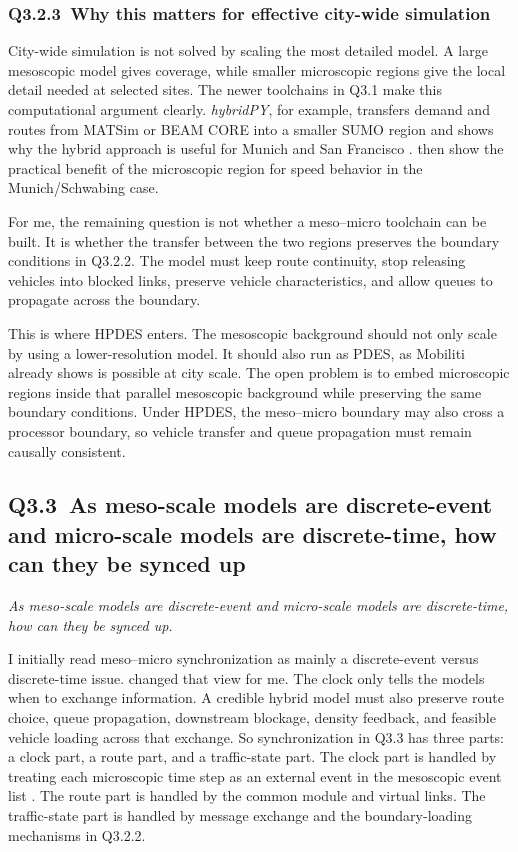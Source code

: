 \begin{bibunit}[plainnat]
\subsubsection{Q3.2.3\ Why this matters for effective city-wide simulation}

City-wide simulation is not solved by scaling the most detailed model. A large
mesoscopic model gives coverage, while smaller microscopic regions give the
local detail needed at selected sites. The newer toolchains in Q3.1 make this
computational argument clearly. \textit{hybridPY}, for example, transfers
demand and routes from MATSim or BEAM CORE into a smaller SUMO region and shows
why the hybrid approach is useful for Munich and San Francisco
\citep{schweizer2024hybridpy}. \citet{schuhmann2025hybrid} then show the
practical benefit of the microscopic region for speed behavior in the
Munich/Schwabing case.

For me, the remaining question is not whether a meso--micro toolchain can be
built. It is whether the transfer between the two regions preserves the
boundary conditions in Q3.2.2. The model must keep route continuity, stop
releasing vehicles into blocked links, preserve vehicle characteristics, and
allow queues to propagate across the boundary.

This is where HPDES enters. The mesoscopic background should not only scale by
using a lower-resolution model. It should also run as PDES, as Mobiliti already
shows is possible at city scale. The open problem is to embed microscopic
regions inside that parallel mesoscopic background while preserving the same
boundary conditions. Under HPDES, the meso--micro boundary may also cross a
processor boundary, so vehicle transfer and queue propagation must remain
causally consistent.

\subsection{Q3.3\ As meso-scale models are discrete-event and micro-scale models are discrete-time, how can they be synced up}

\textit{As meso-scale models are discrete-event and micro-scale models are discrete-time, how can they be synced up.}

\iffalse
I initially read meso--micro synchronization as mainly a discrete-event versus discrete-time issue. \citet{burghout2004thesis} changed that view for me. The clock only tells the models when to exchange information. A credible hybrid model must also preserve route choice, queue propagation, downstream blockage, density feedback, and feasible vehicle loading across that exchange. So synchronization in Q3.3 has three parts: a clock part, a route part, and a traffic-state part. The clock part is handled by treating each microscopic time step as an external event in the mesoscopic event list \citep{burghout2006discrete}. The route part is handled by the common module and virtual links. The traffic-state part is handled by message exchange and the boundary-loading mechanisms in Q3.2.2.


\end{bibunit}

